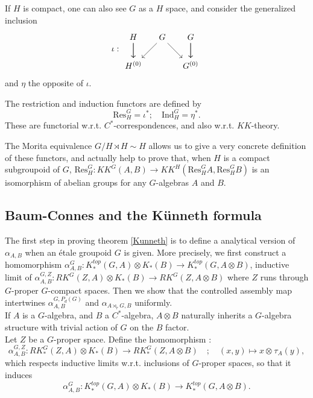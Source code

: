 If $H$ is compact, one can also see $G$ as a $H$ space, and consider the generalized inclusion  
\[\iota : 
\begin{tikzcd}[column sep = small] 
H \arrow{d} \arrow{d} & \arrow{dl} G \arrow{dr} & G\arrow{d} \arrow{d} \\
 H^{(0)} & & G^{(0)}
\end{tikzcd}\]
and $\eta$ the opposite of $\iota$.  
\begin{definition}
The restriction and induction functors are defined by
\[ \text{Res}_H^G = \iota^*;\quad \text{Ind}_H^G = \eta^*.\]
These are functorial w.r.t. $C^*$-correspondences, and also w.r.t. $KK$-theory.
\end{definition}

The Morita equivalence $G/H\rtimes H \sim H$ allows us to give a very concrete definition of these functors, and actually help to prove that, when $H$ is a compact subgroupoid of $G$, $\text{Res}_{H}^G : KK^G(A,B)\rightarrow KK^H( \text{Res}_{H}^G A , \text{Res}_{H}^G B)$ is an isomorphism of abelian groups for any $G$-algebras $A$ and $B$. 

\subsection{Baum-Connes and the Künneth formula}

The first step in proving theorem \ref{Kunneth} is to define a analytical version of $\alpha_{A,B}$ when an étale groupoid $G$ is given. More precisely, we first construct a homomorphism $\alpha_{A,B}^G : K_*^{top}(G,A)\otimes K_*(B)\rightarrow K_*^{top}(G,A\otimes B )$, inductive limit of $\alpha_{A,B}^{G,Z} : RK^G(Z,A)\otimes K_*(B)\rightarrow RK^G(Z,A\otimes B )$ where $Z$ runs through $G$-proper $G$-compact spaces. Then we show that the controlled assembly map intertwines $\alpha^{G,P_d(G)}_{A,B}$ and $\alpha_{A\rtimes_r G,B}$ uniformly.\\

If $A$ is a $G$-algebra, and $B$ a $C^*$-algebra, $A\otimes B$ naturally inherits a $G$-algebra structure with trivial action of $G$ on the $B$ factor.\\

Let $Z$ be a $G$-proper space. Define the homomorphism :
\[\alpha_{A,B}^{G,Z} : RK^G_*(Z,A)\otimes K_*(B)\rightarrow RK_*^G(Z,A\otimes B) \quad ; \quad (x,y)\mapsto x\otimes_{}   \tau_A(y),\]
which respects inductive limits w.r.t. inclusions of $G$-proper spaces, so that it induces
\[\alpha_{A,B}^G : K_*^{top}(G,A)\otimes K_*(B)\rightarrow K_*^{top}(G,A\otimes B ).\]

